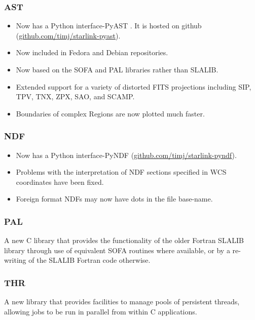 \subsubsection{AST}
\begin{itemize}
\item Now has a Python interface-PyAST \citep{P011_adassxxi}. It is hosted on github (\url{github.com/timj/starlink-pyast}).
\item Now included in Fedora and Debian repositories.
\item Now based on the SOFA and PAL libraries rather than SLALIB.
\item Extended support for a variety of distorted FITS projections including SIP, TPV, TNX, ZPX, SAO, and SCAMP.
\item Boundaries of complex Regions are now plotted much faster.
\end{itemize}

\subsubsection{NDF}
\begin{itemize}
\item Now has a Python interface-PyNDF (\url{github.com/timj/starlink-pyndf}).
\item Problems with the interpretation of NDF sections specified in WCS coordinates have been fixed.
\item Foreign format NDFs may now have dots in the file base-name.
\end{itemize}

\subsubsection{PAL}
A new C library that provides the functionality of the older Fortran SLALIB library through use of equivalent SOFA routines where available, or by a re-writing of the SLALIB Fortran code otherwise.

\subsubsection{THR}
A new library that provides facilities to manage pools of persistent threads, allowing jobs to be run in parallel from within C applications.

